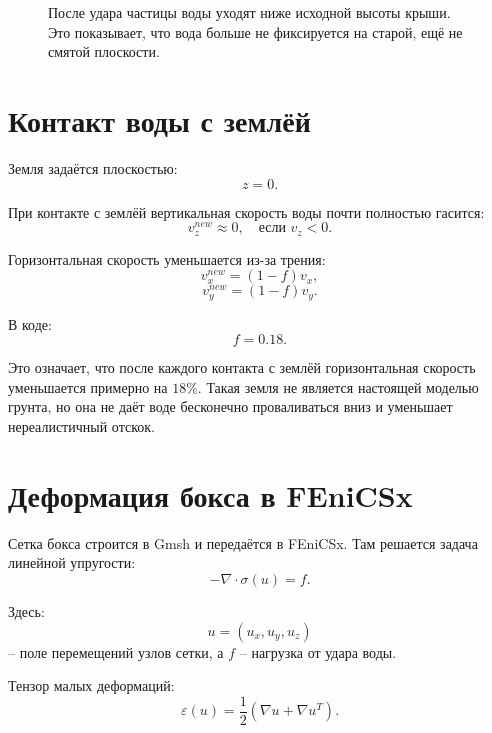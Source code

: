\documentclass[12pt,a4paper]{article}
\begin{document}
\begin{figure}[h]
\centering
{}
\caption{После удара частицы воды уходят ниже исходной высоты крыши. Это
показывает, что вода больше не фиксируется на старой, ещё не смятой плоскости.}
\end{figure}

\section{Контакт воды с землёй}

Земля задаётся плоскостью:
\[
z=0.
\]

При контакте с землёй вертикальная скорость воды почти полностью гасится:
\[
v_z^{new} \approx 0, \quad \text{если } v_z < 0.
\]

Горизонтальная скорость уменьшается из-за трения:
\[
v_x^{new} = (1-f)v_x,
\]
\[
v_y^{new} = (1-f)v_y.
\]

В коде:
\[
f = 0.18.
\]

Это означает, что после каждого контакта с землёй горизонтальная скорость
уменьшается примерно на \(18\%\). Такая земля не является настоящей моделью
грунта, но она не даёт воде бесконечно проваливаться вниз и уменьшает
нереалистичный отскок.

\section{Деформация бокса в FEniCSx}

Сетка бокса строится в Gmsh и передаётся в FEniCSx. Там решается задача линейной
упругости:
\[
-\nabla \cdot \sigma(u)=f.
\]

Здесь:
\[
u = (u_x,u_y,u_z)
\]
-- поле перемещений узлов сетки, а \(f\) -- нагрузка от удара воды.

Тензор малых деформаций:
\[
\varepsilon(u)=
\frac{1}{2}\left(\nabla u + \nabla u^T\right).
\]
\end{document}

